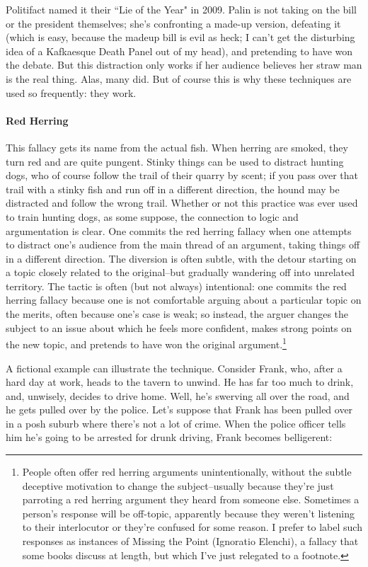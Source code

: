 Politifact named it their ``Lie of the Year" in 2009. Palin is not taking on the bill or the president
themselves; she's confronting a made-up version, defeating it (which is easy, because the madeup bill is 
evil as heck; I can't get the disturbing idea of a Kafkaesque Death Panel out of my head),
and pretending to have won the debate. But this distraction only works if her audience believes her
straw man is the real thing. Alas, many did. But of course this is why these techniques are used so
frequently: they work.

\paragraph{Red Herring}
This fallacy gets its name from the actual fish. When herring are smoked, they turn red and are
quite pungent. Stinky things can be used to distract hunting dogs, who of course follow the trail of
their quarry by scent; if you pass over that trail with a stinky fish and run off in a different direction,
the hound may be distracted and follow the wrong trail. Whether or not this practice was ever used
to train hunting dogs, as some suppose, the connection to logic and argumentation is clear. One
commits the red herring fallacy when one attempts to distract one's audience from the main thread
of an argument, taking things off in a different direction. The diversion is often subtle, with the
detour starting on a topic closely related to the original--but gradually wandering off into
unrelated territory. The tactic is often (but not always) intentional: one commits the red herring
fallacy because one is not comfortable arguing about a particular topic on the merits, often because
one's case is weak; so instead, the arguer changes the subject to an issue about which he feels more
confident, makes strong points on the new topic, and pretends to have won the original 
argument.\footnote{People often offer red herring arguments unintentionally, without the subtle deceptive motivation to change the
subject--usually because they're just parroting a red herring argument they heard from someone else. Sometimes a
person's response will be off-topic, apparently because they weren't listening to their interlocutor or they're confused
for some reason. I prefer to label such responses as instances of Missing the Point (Ignoratio Elenchi), a fallacy that
some books discuss at length, but which I've just relegated to a footnote.}

A fictional example can illustrate the technique. Consider Frank, who, after a hard day at work,
heads to the tavern to unwind. He has far too much to drink, and, unwisely, decides to drive home.
Well, he's swerving all over the road, and he gets pulled over by the police. Let's suppose that
Frank has been pulled over in a posh suburb where there's not a lot of crime. When the police
officer tells him he's going to be arrested for drunk driving, Frank becomes belligerent:

